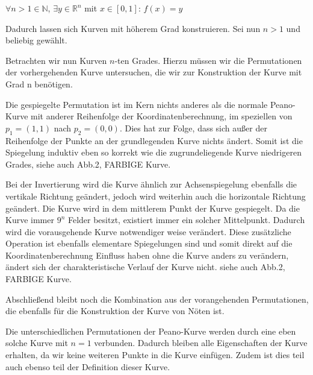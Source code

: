\documentclass[course=asp]{aspdoc}
\begin{document}
\begin{center}
$\forall n>1 \in \mathbb{N}$, $\exists y \in \mathbb{R}^n$ mit $x \in [0,1]$: $f(x)= y$	%
\end{center}


Dadurch lassen sich Kurven mit höherem Grad konstruieren. Sei nun $n>1$ und beliebig gewählt.

Betrachten wir nun Kurven $n$-ten Grades. Hierzu müssen wir die Permutationen der vorhergehenden Kurve untersuchen, die wir zur Konstruktion der Kurve mit Grad n benötigen.	

Die gespiegelte Permutation ist im Kern nichts anderes als die normale Peano-Kurve mit anderer Reihenfolge der Koordinatenberechnung, im speziellen von $p_1=(1,1)$ nach $p_2 = (0,0)$. Dies hat zur Folge, dass sich außer der Reihenfolge der Punkte an der grundlegenden Kurve nichts ändert. Somit ist die Spiegelung induktiv eben so korrekt wie die zugrundeliegende Kurve niedrigeren Grades, siehe auch Abb.2, FARBIGE Kurve.

Bei der Invertierung wird die Kurve ähnlich zur Achsenspiegelung ebenfalls die vertikale Richtung geändert, jedoch wird weiterhin auch die horizontale Richtung geändert. Die Kurve wird in dem mittlerem Punkt der Kurve gespiegelt. Da die Kurve immer $9^n$ Felder besitzt, existiert immer ein solcher Mittelpunkt. Dadurch wird die vorausgehende Kurve notwendiger weise verändert.  Diese zusätzliche Operation ist ebenfalls elementare Spiegelungen sind und somit direkt auf die Koordinatenberechnung Einfluss haben ohne die Kurve anders zu verändern, ändert sich der charakteristische Verlauf der Kurve nicht. siehe auch Abb.2, FARBIGE Kurve.

Abschließend bleibt noch die Kombination aus der vorangehenden Permutationen, die ebenfalls für die Konstruktion der Kurve von Nöten ist.


Die unterschiedlichen Permutationen der Peano-Kurve werden durch eine eben solche Kurve mit $n = 1$ verbunden. Dadurch bleiben alle Eigenschaften der Kurve erhalten, da wir keine weiteren Punkte in die Kurve einfügen. Zudem ist dies teil auch ebenso teil der Definition dieser Kurve. 

\end{document}
